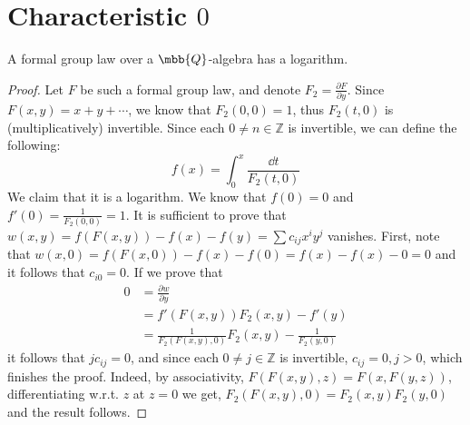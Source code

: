 \section{Characteristic $0$}

\begin{theorem*}
	A formal group law over a $\mbb{Q}$-algebra has a logarithm.
\end{theorem*}

\begin{proof}
	Let $F$ be such a formal group law, and denote $F_2 = \frac{\partial F}{\partial y}$.
	Since $F\left(x,y\right) = x+y+\cdots$, we know that $F_2\left(0,0\right) = 1$, thus $F_2\left(t,0\right)$ is (multiplicatively) invertible.
	Since each $0 \neq n \in \mathbb{Z}$ is invertible, we can define the following:
	$$ f\left(x\right) = \int_0^x \frac{\dd{t}}{F_2\left(t,0\right)} $$
	We claim that it is a logarithm.
	We know that $f\left(0\right) = 0$ and $f'\left(0\right) = \frac{1}{F_2\left(0,0\right)} = 1$.
	It is sufficient to prove that
	$
		w\left(x,y\right)
		= f\left(F\left(x,y\right)\right) - f\left(x\right) - f\left(y\right)
		= \sum c_{ij} x^i y^j
	$
	vanishes.
	First, note that
	$
		w\left(x,0\right)
		= f\left(F\left(x,0\right)\right) - f\left(x\right) - f\left(0\right)
		= f\left(x\right) - f\left(x\right) - 0
		= 0
	$
	and it follows that $c_{i0} = 0$.
	If we prove that
	\begin{align*}
		0
		&= \frac{\partial w}{\partial y}\\
		&= f'\left(F\left(x,y\right)\right) F_2\left(x,y\right) - f'\left(y\right)\\
		&= \frac{1}{F_2\left(F\left(x,y\right),0\right)} F_2\left(x,y\right) - \frac{1}{F_2\left(y,0\right)}
	\end{align*}
	it follows that $j c_{ij} = 0$, and since each $0 \neq j \in \mathbb{Z}$ is invertible, $c_{ij} = 0, j > 0$, which finishes the proof.
	Indeed, by associativity,
	$F\left(F\left(x,y\right),z\right)=F\left(x,F\left(y,z\right)\right)$, differentiating w.r.t. $z$ at $z=0$ we get,
	$
		F_2\left(F\left(x,y\right),0\right)
		= F_2\left(x,y\right) F_2\left(y,0\right)
	$
	and the result follows.
\end{proof}